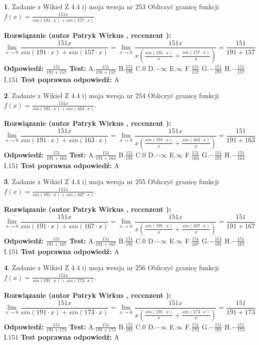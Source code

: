 \documentclass[12pt, a4paper]{article}
\theoremstyle{definition} %
\newtheorem{zad}{}
\newcommand{\zadStart}[1]{\begin{zad}#1\newline}
\newcommand{\zadStop}{\end{zad}}
\newcommand{\rozwStart}[2]{\noindent \textbf{Rozwiązanie (autor #1 , recenzent #2): }\newline}
\newcommand{\rozwStop}{\newline}
\newcommand{\odpStart}{\noindent \textbf{Odpowiedź:}\newline}
\newcommand{\odpStop}{\newline}
\newcommand{\testStart}{\noindent \textbf{Test:}\newline}
\newcommand{\testStop}{\newline}
\newcommand{\kluczStart}{\noindent \textbf{Test poprawna odpowiedź:}\newline}
\newcommand{\kluczStop}{\newline}
\begin{document}
\zadStart{Zadanie z Wikieł Z 4.4 i) moja wersja nr 253}
Obliczyć granicę funkcji $f(x)=\frac{151x}{sin(191\cdot x) +sin(157\cdot x)}$.
\zadStop
\rozwStart{Patryk Wirkus}{}
$$\lim\limits_{x\to 0}\frac{151x}{sin(191\cdot x) +sin(157\cdot x)}=\lim\limits_{x\to 0}\frac{151x}{x(\frac{sin(191\cdot x)}{x}+\frac{sin(157\cdot x)}{x})}=\frac{151}{191+157}$$
\rozwStop
\odpStart
$\frac{151}{191+157}$
\odpStop
\testStart
A.$\frac{151}{191+157}$
B.$\frac{151}{191}$
C.$0$
D.$-\infty$
E.$\infty$
F.$\frac{151}{157}$
G.$-\frac{151}{191}$
H.$-\frac{151}{157}$
I.$151$
\testStop
\kluczStart
A
\kluczStop



\zadStart{Zadanie z Wikieł Z 4.4 i) moja wersja nr 254}
Obliczyć granicę funkcji $f(x)=\frac{151x}{sin(191\cdot x) +sin(163\cdot x)}$.
\zadStop
\rozwStart{Patryk Wirkus}{}
$$\lim\limits_{x\to 0}\frac{151x}{sin(191\cdot x) +sin(163\cdot x)}=\lim\limits_{x\to 0}\frac{151x}{x(\frac{sin(191\cdot x)}{x}+\frac{sin(163\cdot x)}{x})}=\frac{151}{191+163}$$
\rozwStop
\odpStart
$\frac{151}{191+163}$
\odpStop
\testStart
A.$\frac{151}{191+163}$
B.$\frac{151}{191}$
C.$0$
D.$-\infty$
E.$\infty$
F.$\frac{151}{163}$
G.$-\frac{151}{191}$
H.$-\frac{151}{163}$
I.$151$
\testStop
\kluczStart
A
\kluczStop



\zadStart{Zadanie z Wikieł Z 4.4 i) moja wersja nr 255}
Obliczyć granicę funkcji $f(x)=\frac{151x}{sin(191\cdot x) +sin(167\cdot x)}$.
\zadStop
\rozwStart{Patryk Wirkus}{}
$$\lim\limits_{x\to 0}\frac{151x}{sin(191\cdot x) +sin(167\cdot x)}=\lim\limits_{x\to 0}\frac{151x}{x(\frac{sin(191\cdot x)}{x}+\frac{sin(167\cdot x)}{x})}=\frac{151}{191+167}$$
\rozwStop
\odpStart
$\frac{151}{191+167}$
\odpStop
\testStart
A.$\frac{151}{191+167}$
B.$\frac{151}{191}$
C.$0$
D.$-\infty$
E.$\infty$
F.$\frac{151}{167}$
G.$-\frac{151}{191}$
H.$-\frac{151}{167}$
I.$151$
\testStop
\kluczStart
A
\kluczStop



\zadStart{Zadanie z Wikieł Z 4.4 i) moja wersja nr 256}
Obliczyć granicę funkcji $f(x)=\frac{151x}{sin(191\cdot x) +sin(173\cdot x)}$.
\zadStop
\rozwStart{Patryk Wirkus}{}
$$\lim\limits_{x\to 0}\frac{151x}{sin(191\cdot x) +sin(173\cdot x)}=\lim\limits_{x\to 0}\frac{151x}{x(\frac{sin(191\cdot x)}{x}+\frac{sin(173\cdot x)}{x})}=\frac{151}{191+173}$$
\rozwStop
\odpStart
$\frac{151}{191+173}$
\odpStop
\testStart
A.$\frac{151}{191+173}$
B.$\frac{151}{191}$
C.$0$
D.$-\infty$
E.$\infty$
F.$\frac{151}{173}$
G.$-\frac{151}{191}$
H.$-\frac{151}{173}$
I.$151$
\testStop
\kluczStart
A
\kluczStop
\end{document}
